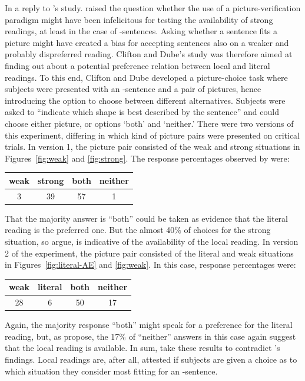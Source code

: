 \documentclass[fleqn,reqno,10pt]{article}
\newcommand{\as}{\acro{as}}
\begin{document}
In a reply to \citeauthor{GeurtsPouscoulous2009:Embedded-Implic}'s
study. \citet{CliftonDube2010:Embedded-Implic} raised the question
whether the use of a picture-verification paradigm might have been
infelicitous for testing the availability of strong readings, at least
in the case of \as-sentences. Asking whether a sentence fits a picture
might have created a bias for accepting sentences also on a weaker and
probably dispreferred reading. Clifton and Dube's study was therefore
aimed at finding out about a potential preference relation between
local and literal readings. To this end, Clifton and Dube developed a
picture-choice task where subjects were presented with an \as-sentence
and a pair of pictures, hence introducing the option to choose between
different alternatives. Subjects were asked to ``indicate which shape
is best described by the sentence'' and could choose either picture,
or options `both' and `neither.' There were two versions of this
experiment, differing in which kind of picture pairs were presented on
critical trials. In version 1, the picture pair consisted of the weak
and strong situations in Figures~\ref{fig:weak} and
\ref{fig:strong}. The response percentages observed by
\citeauthor{CliftonDube2010:Embedded-Implic} were:

\begin{center}
  \begin{tabular}{cccc}
    weak & strong & both & neither
    \\ \midrule 
 3 & 39 & 57 & 1 
  \end{tabular}
\end{center}

\noindent That the majority answer is ``both'' could be taken as
evidence that the literal reading is the preferred one. But the almost
40\% of choices for the strong situation, so
\citeauthor{CliftonDube2010:Embedded-Implic} argue, is indicative of
the availability of the local reading. In version 2 of the experiment,
the picture pair consisted of the literal and weak situations in
Figures~\ref{fig:literal-AE} and \ref{fig:weak}. In this case,
response percentages were:

\begin{center}
  \begin{tabular}{cccc}
    weak & literal & both & neither
    \\ \midrule 
    28 & 6 & 50 & 17 
  \end{tabular}
\end{center}

\noindent Again, the majority response ``both'' might speak for a
preference for the literal reading, but, as
\citeauthor{CliftonDube2010:Embedded-Implic} propose, the 17\% of
``neither'' answers in this case again suggest that the local reading
is available. In sum,
\citeauthor{CliftonDube2010:Embedded-Implic} take these results to
contradict \citeauthor{GeurtsPouscoulous2009:Embedded-Implic}'s
findings. Local readings are, after all, attested if subjects are
given a choice as to which situation they consider most fitting for an
\as-sentence.
\end{document}
